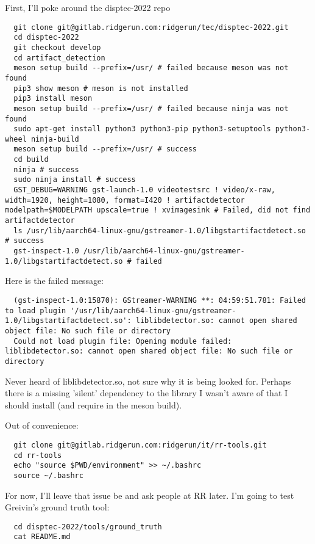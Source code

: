 \documentclass[12pt,oneside]{book}
\begin{document}
First, I'll poke around the disptec-2022 repo
\begin{lstlisting}
  git clone git@gitlab.ridgerun.com:ridgerun/tec/disptec-2022.git
  cd disptec-2022
  git checkout develop
  cd artifact_detection
  meson setup build --prefix=/usr/ # failed because meson was not found
  pip3 show meson # meson is not installed 
  pip3 install meson
  meson setup build --prefix=/usr/ # failed because ninja was not found
  sudo apt-get install python3 python3-pip python3-setuptools python3-wheel ninja-build
  meson setup build --prefix=/usr/ # success
  cd build
  ninja # success
  sudo ninja install # success
  GST_DEBUG=WARNING gst-launch-1.0 videotestsrc ! video/x-raw, width=1920, height=1080, format=I420 ! artifactdetector modelpath=$MODELPATH upscale=true ! xvimagesink # Failed, did not find artifactdetector
  ls /usr/lib/aarch64-linux-gnu/gstreamer-1.0/libgstartifactdetect.so # success
  gst-inspect-1.0 /usr/lib/aarch64-linux-gnu/gstreamer-1.0/libgstartifactdetect.so # failed \end{lstlisting}

Here is the failed message:
\begin{lstlisting}
  (gst-inspect-1.0:15870): GStreamer-WARNING **: 04:59:51.781: Failed to load plugin '/usr/lib/aarch64-linux-gnu/gstreamer-1.0/libgstartifactdetect.so': liblibdetector.so: cannot open shared object file: No such file or directory
  Could not load plugin file: Opening module failed: liblibdetector.so: cannot open shared object file: No such file or directory\end{lstlisting}
    
Never heard of liblibdetector.so, not sure why it is being looked for. Perhaps there is a missing 'silent' dependency to the library I wasn't aware of that I should install (and require in the meson build).

Out of convenience:
\begin{lstlisting}
  git clone git@gitlab.ridgerun.com:ridgerun/it/rr-tools.git
  cd rr-tools
  echo "source $PWD/environment" >> ~/.bashrc
  source ~/.bashrc \end{lstlisting}

For now, I'll leave that issue be and ask people at RR later. I'm going to test Greivin's ground truth tool:
\begin{lstlisting}
  cd disptec-2022/tools/ground_truth
  cat README.md
  \end{lstlisting}
\end{document}
